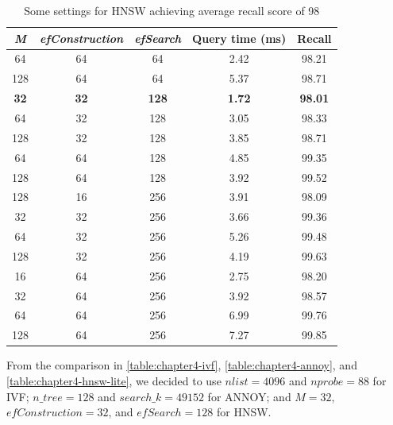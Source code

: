 \begin{table}[h!]
\centering
\begin{tabular}{c c c c c}
\hline
\textit{M} & \textit{efConstruction} & \textit{efSearch} & Query time (ms)  & Recall         \\ \hline
64 & 64 & 64   & 2.42 & 98.21 \\
128 & 64 & 64  & 5.37 & 98.71 \\
\textbf{32} & \textbf{32} & \textbf{128}  & \textbf{1.72} & \textbf{98.01} \\
64 & 32 & 128  & 3.05 & 98.33 \\
128 & 32 & 128 & 3.85 & 98.71 \\
64 & 64 & 128  & 4.85 & 99.35 \\
128 & 64 & 128 & 3.92 & 99.52 \\
128 & 16 & 256 & 3.91 & 98.09 \\
32 & 32 & 256  & 3.66 & 99.36 \\
64 & 32 & 256  & 5.26 & 99.48 \\
128 & 32 & 256 & 4.19 & 99.63 \\
16 & 64 & 256  & 2.75 & 98.20 \\
32 & 64 & 256  & 3.92 & 98.57 \\
64 & 64 & 256  & 6.99 & 99.76 \\
128 & 64 & 256 & 7.27 & 99.85
\\ \hline
\end{tabular}
\caption{Some settings for HNSW achieving average recall score of 98}
\label{table:chapter4-hnsw-lite}
\end{table}

From the comparison in \autoref{table:chapter4-ivf}, \autoref{table:chapter4-annoy}, and \autoref{table:chapter4-hnsw-lite}, we decided to use $nlist = 4096$ and $nprobe = 88$ for IVF; $n\_tree = 128$ and $search\_k = 49152$ for ANNOY; and $M = 32$, $efConstruction = 32$, and $efSearch = 128$ for HNSW. 

